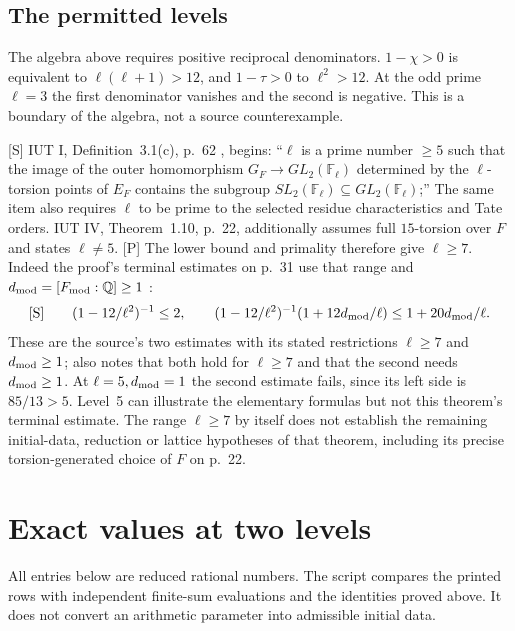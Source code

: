 \documentclass[11pt]{article}
\theoremstyle{remark}
\newcommand{\Fmod}{F_{\mathrm{mod}}}
\newcommand{\Smark}{\textup{[S]}}
\newcommand{\Pmark}{\textup{[P]}}
\begin{document}
\subsection*{The permitted levels}

The algebra above requires positive reciprocal denominators.
$1-\chi>0$ is equivalent to $\ell(\ell+1)>12$, and $1-\tau>0$
to $\ell^2>12$.  At the odd prime $\ell=3$ the first denominator
vanishes and the second is negative.  This is a boundary of the algebra,
not a source counterexample.

\Smark{} IUT I, Definition~3.1(c), p.~62 \cite[Def.~3.1(c), p.~62]{IUT1}, begins:
``$\ell$ is a prime number $\ge5$ such that the image of the outer
homomorphism $G_F\to GL_2(\mathbb F_\ell)$ determined by the
$\ell$-torsion points of $E_F$ contains the subgroup
$SL_2(\mathbb F_\ell)\subseteq GL_2(\mathbb F_\ell)$;''
The same item also requires $\ell$ to be prime to the selected residue
characteristics and Tate orders.  IUT IV, Theorem~1.10,
p.~22, additionally assumes full $15$-torsion over $F$ and states
$\ell\ne5$.  \Pmark{} The lower bound and primality therefore give $\ell\ge7$.
Indeed the proof's terminal estimates on p.~31 use that range and
$d_{\rm mod}=[\Fmod:\mathbb Q]\ge1$
\cite[Thm.~1.10, proof, Step~(viii), p.~31]{IUT4}:
\[
 \Smark\qquad
 (1-12/\ell^2)^{-1}\le2,\qquad
 (1-12/\ell^2)^{-1}(1+12d_{\rm mod}/\ell)
 \le1+20d_{\rm mod}/\ell.
\]
These are the source's two estimates with its stated restrictions
$\ell\ge7$ and $d_{\rm mod}\ge1$; \cite[\S3.2]{Sf1} also notes that both hold for
$\ell\ge7$ and that the second needs $d_{\rm mod}\ge1$.
At $\ell=5,d_{\rm mod}=1$ the second estimate fails, since its left side
is $85/13>5$.  Level~5 can illustrate the elementary formulas but not
this theorem's terminal estimate.  The range $\ell\ge7$ by itself
does not establish the remaining initial-data, reduction or lattice
hypotheses of that theorem, including its precise torsion-generated
choice of $F$ on p.~22.

\section{Exact values at two levels}\label{s:tables}

All entries below are reduced rational numbers.  The script compares
the printed rows with independent finite-sum evaluations and the identities
proved above.  It does not convert an arithmetic parameter into admissible
initial data.
\end{document}
